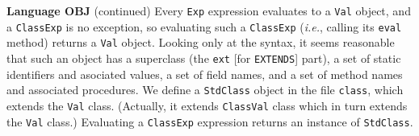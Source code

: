 \begin{minipage}[t]{\sw}
\slidenumber
\LARGE
{\bf Language OBJ} (continued)\exx
Every \verb'Exp' expression evaluates to a \verb'Val' object,
and a \verb'ClassExp' is no exception,
so evaluating such a \verb'ClassExp'
({\em i.e.}, calling its \verb'eval' method)
returns a \verb'Val' object.
Looking only at the syntax,
it seems reasonable
that such an object has a superclass
(the \verb'ext' [for \verb'EXTENDS'] part),
a set of static identifiers and asociated values,
a set of field names,
and a set of method names and associated procedures.\exx
We define a \verb'StdClass' object in the file \verb'class',
which extends the \verb'Val' class.
(Actually, it extends \verb'ClassVal' class
which in turn extends the \verb'Val' class.)
Evaluating a \verb'ClassExp' expression
returns an instance of \verb'StdClass'.
\end{minipage}
